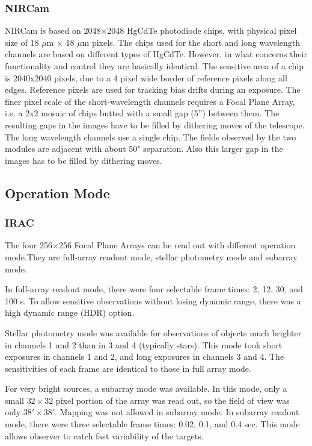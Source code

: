 \documentclass[preprint, 12pt]{aastex}
\begin{document}
\subsubsection{NIRCam}

NIRCam is based on 2048$\times$2048 HgCdTe photodiode chips, with
physical pixel size of 18 $\mu$m $\times$ 18 $\mu$m pixels. The chips
used for the short and long wavelength channels are based on different
types of HgCdTe. However, in what concerns their functionality and
control they are basically identical.  The sensitive area of a chip is
2040x2040 pixels, due to a 4 pixel wide border of reference pixels
along all edges. Reference pixels are used for tracking bias drifts
during an exposure.  The finer pixel scale of the short-wavelength
channels requires a Focal Plane Array, i.e. a 2x2 mosaic of chips
butted with a small gap (5”) between them. The resulting gaps in the
images have to be filled by dithering moves of the telescope. The long
wavelength channels use a single chip.  The fields observed by the two
modules are adjacent with about 50" separation. Also this larger gap
in the images has to be filled by dithering moves.


\subsection{Operation Mode}
\subsubsection{IRAC}

The four 256$\times$256 Focal Plane Arrays can be read out with different
operation mode.They are full-array readout mode, stellar photometry
mode and subarray mode.\par

In full-array readout mode, there were four selectable frame times: 2,
12, 30, and 100 s. To allow sensitive observations without losing dynamic
range, there was a high dynamic range (HDR) option. 

Stellar photometry mode was available for observations of objects much
brighter in channels 1 and 2 than in 3 and 4 (typically stars). This
mode took short exposures in channels 1 and 2, and long exposures in
channels 3 and 4.  The sensitivities of each frame are identical to
those in full array mode.

For very bright sources, a subarray mode was available. In this mode,
only a small $32 \times 32$ pixel portion of the array was read out,
so the field of view was only $38' \times 38'$. Mapping was not
allowed in subarray mode.  In subarray readout mode, there were three
selectable frame times: 0.02, 0.1, and 0.4 sec. This mode allows
observer to catch fast variability of the targets.
\end{document}
